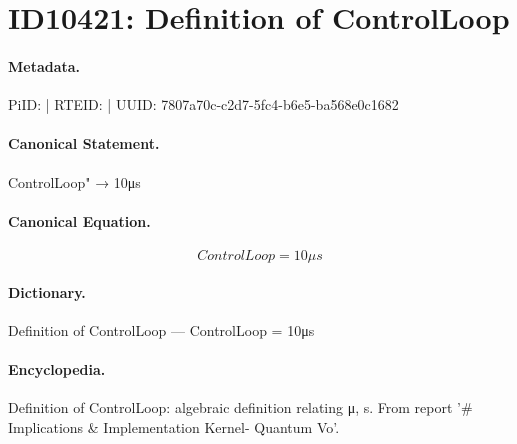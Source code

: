 \section*{ID10421: Definition of ControlLoop}
\paragraph{Metadata.}
PiID:  | RTEID:  | UUID: 7807a70c-c2d7-5fc4-b6e5-ba568e0c1682

\paragraph{Canonical Statement.}
ControlLoop" → 10μs

\paragraph{Canonical Equation.}
\[
ControlLoop = 10μs
\]

\paragraph{Dictionary.}
Definition of ControlLoop — ControlLoop = 10μs

\paragraph{Encyclopedia.}
Definition of ControlLoop: algebraic definition relating μ, s. From report '\# Implications \& Implementation Kernel- Quantum Vo'.

